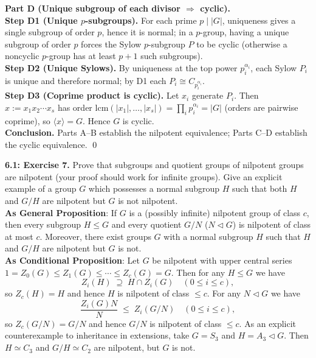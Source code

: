 \documentclass[12pt]{article}
\theoremstyle{definition}
\begin{document}
\medskip
\textbf{Part D (Unique subgroup of each divisor $\Rightarrow$ cyclic).}\\
\textbf{Step D1 (Unique $p$-subgroups).} For each prime $p\mid |G|$, uniqueness gives a single subgroup of order $p$, hence it is normal; in a $p$-group, having a unique subgroup of order $p$ forces the Sylow $p$-subgroup $P$ to be cyclic (otherwise a noncyclic $p$-group has at least $p+1$ such subgroups).\\
\textbf{Step D2 (Unique Sylows).} By uniqueness at the top power $p_i^{\alpha_i}$, each Sylow $P_i$ is unique and therefore normal; by D1 each $P_i\cong C_{p_i^{\alpha_i}}$.\\
\textbf{Step D3 (Coprime product is cyclic).} Let $x_i$ generate $P_i$. Then $x:=x_1x_2\cdots x_s$ has order $\mathrm{lcm}(|x_1|,\dots,|x_s|)=\prod_i p_i^{\alpha_i}=|G|$ (orders are pairwise coprime), so $\langle x\rangle=G$. Hence $G$ is cyclic.\\

\medskip
\textbf{Conclusion.} Parts A–B establish the nilpotent equivalence; Parts C–D establish the cyclic equivalence. \qed

\newpage

\newpage

\noindent \textbf{6.1: Exercise 7.} Prove that subgroups and quotient groups of nilpotent groups are nilpotent (your proof should work for infinite groups). Give an explicit example of a group $G$ which possesses a normal subgroup $H$ such that both $H$ and $G/H$ are nilpotent but $G$ is not nilpotent.\\ %

\noindent\textbf{As General Proposition}: If $G$ is a (possibly infinite) nilpotent group of class $c$, then every subgroup $H\le G$ and every quotient $G/N$ ($N\lhd G$) is nilpotent of class at most $c$. Moreover, there exist groups $G$ with a normal subgroup $H$ such that $H$ and $G/H$ are nilpotent but $G$ is not.\\

\noindent\textbf{As Conditional Proposition}: Let $G$ be nilpotent with upper central series $1=Z_0(G)\le Z_1(G)\le\cdots\le Z_c(G)=G$. Then for any $H\le G$ we have
\[
Z_i(H)\;\supseteq\;H\cap Z_i(G)\quad(0\le i\le c),
\]
so $Z_c(H)=H$ and hence $H$ is nilpotent of class $\le c$. For any $N\lhd G$ we have
\[
\frac{Z_i(G)N}{N}\;\le\; Z_i(G/N)\quad(0\le i\le c),
\]
so $Z_c(G/N)=G/N$ and hence $G/N$ is nilpotent of class $\le c$. As an explicit counterexample to inheritance in extensions, take $G=S_3$ and $H=A_3\lhd G$. Then $H\simeq C_3$ and $G/H\simeq C_2$ are nilpotent, but $G$ is not.\\
\end{document}
